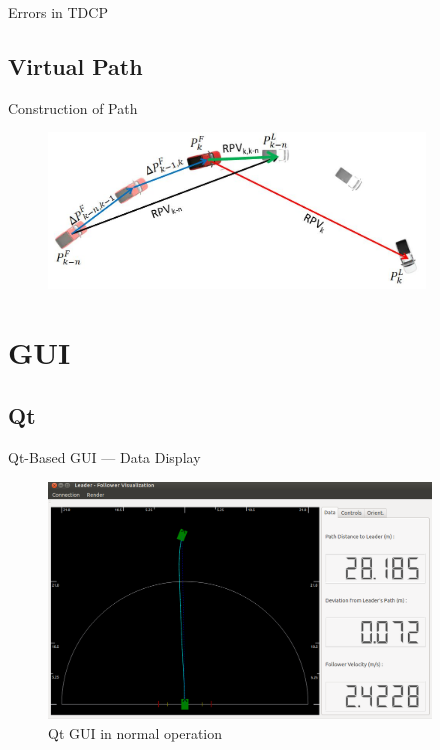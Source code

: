 \documentclass{beamer}
\begin{document}
    \begin{frame}{Errors in TDCP}
    \end{frame}

  \subsection{Virtual Path}

    \begin{frame}{Construction of Path}
      \begin{figure}
        \includegraphics[width=10cm]{../graphics/path_algorithm.png}
      \end{figure}
    \end{frame}


\section{GUI}

  \subsection{Qt}

    \begin{frame}{Qt-Based GUI --- Data Display}
      \begin{figure}[ht] \centering
        \includegraphics[width=4in] {../graphics/final_design_data.png}
        \caption{Qt GUI in normal operation} \label{fig:qt_data_display}
      \end{figure}
    \end{frame}
\end{document}
